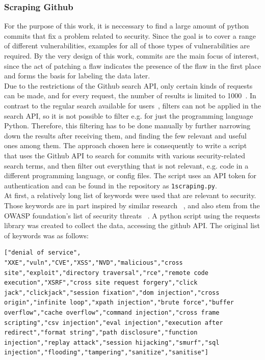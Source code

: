 \documentclass[
	a4paper,
	pagesize,
	pdftex,
	12pt,
	twoside, %
	BCOR=5mm, %
	ngerman,
	fleqn,
	final,
	]{scrartcl}
\begin{document}
\subsubsection{Scraping Github}
For the purpose of this work, it is neccessary to find a large amount of python commits that fix a problem related to security. Since the goal is to cover a range of different vulnerabilities, examples for all of those types of vulnerabilities are required. By the very design of this work, commits are the main focus of interest, since the act of patching a flaw indicates the presence of the flaw in the first place and forms the basis for labeling the data later.\\	
Due to the restrictions of the Github search API, only certain kinds of requests can be made, and for every request, the number of results is limited to 1000~\cite{Github.com.2}. In contrast to the regular search available for users~\cite{Github.com.2019}, filters can not be applied in the search API, so it is not possible to filter e.g. for just the programming language Python. Therefore, this filtering has to be done manually by further narrowing down the results after receiving them, and finding the few relevant and useful ones among them.
The approach chosen here is consequently to write a script that uses the Github API to search for commits with various security-related search terms, and then filter out everything that is not relevant, e.g. code in a different programming language, or config files. The script uses an API token for authentication and can be found in the repository as \texttt{1scraping.py}.\\
At first, a relatively long list of keywords were used that are relevant to security. Those keywords are in part inspired by similar research ~\cite{Zhou.2017}, and also stem from the OWASP foundation's list of security threats ~\cite{OWASPFoundation.}. A python script using the requests library was created to collect the data, accessing the github API. The original list of keywords was as follows:
\lstset{basicstyle=\small}
\begin{lstlisting}
["denial of service", "XXE","vuln","CVE","XSS","NVD","malicious","cross site","exploit","directory traversal","rce","remote code execution","XSRF","cross site request forgery","click jack","clickjack","session fixation","dom injection","cross origin","infinite loop","xpath injection","brute force","buffer overflow","cache overflow","command injection","cross frame scripting","csv injection","eval injection","execution after redirect","format string","path disclosure","function injection","replay attack","session hijacking","smurf","sql injection","flooding","tampering","sanitize","sanitise"]
\end{lstlisting}
\end{document}

